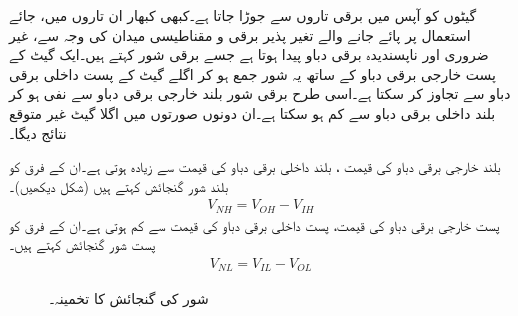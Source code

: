   گیٹوں کو  آپس میں برقی  تاروں سے   جوڑا جاتا ہے۔کبھی کبھار ان تاروں میں،  جائے استعمال پر پائے جانے  والے تغیر پذیر برقی و مقناطیسی میدان  کی وجہ سے،  غیر ضروری اور ناپسندیدہ   برقی دباو پیدا ہوتا ہے جسے  برقی شور  کہتے ہیں۔ایک گیٹ کے پست خارجی برقی دباو    کے ساتھ یہ  شور  جمع ہو کر اگلے گیٹ کے   پست داخلی برقی دباو   سے تجاوز کر سکتا ہے۔اسی طرح  برقی شور بلند خارجی برقی دباو سے نفی ہو کر بلند داخلی برقی دباو  سے  کم ہو سکتا ہے۔ان دونوں  صورتوں  میں اگلا گیٹ   غیر متوقع   نتائج دیگا۔

 بلند خارجی برقی دباو کی قیمت ،  بلند داخلی برقی دباو کی قیمت سے  زیادہ ہوتی ہے۔ان کے فرق کو بلند شور  گنجائش     کہتے ہیں (شکل  دیکھیں)۔
\begin{align}
V_{NH}=V_{OH}-V_{IH}
\end{align}
 پست خارجی برقی دباو کی قیمت، پست  داخلی برقی دباو  کی قیمت سے  کم ہوتی ہے۔ان کے فرق کو پست شور  گنجائش    کہتے ہیں۔
\begin{align}
V_{NL}=V_{IL}-V_{OL}
\end{align}


\begin{figure}
\centering
{}
\caption{شور کی گنجائش کا تخمینہ۔}
\label{شکل_بوولین_گنجائش_شور}
\end{figure}


